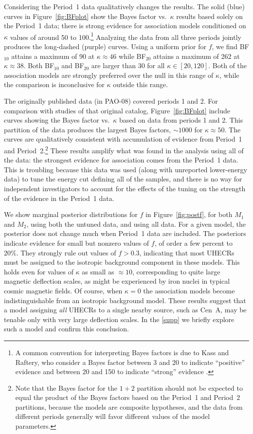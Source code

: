 Considering the Period~1 data qualitatively changes the results.  The
solid (blue) curves in Figure~\ref{fig:BFplot} show the Bayes factor
vs.\ $\kappa$ results based solely on the Period~1 data; there is
strong evidence for association models conditioned on $\kappa$ values
of around 50 to 100.\footnote{A common convention for interpreting
Bayes factors is due to Kass and Raftery, who consider a Bayes factor between
3 and 20 to indicate ``positive'' evidence and between 20 and 150 to indicate
``strong'' evidence \cite{Kass:Raft:baye:1995}.}
Analyzing the data from all three periods jointly produces the long-dashed
(purple) curves.  Using a uniform prior for $f$, we find BF$_{10}$ attains a
maximum of 90 at $\kappa\approx 46$ while BF$_{20}$ attains a maximum of 262
at $\kappa\approx 38$.  Both BF$_{10}$ and BF$_{20}$ are larger than 30 for
all $\kappa\in[20,120]$.  Both of the association models are strongly
preferred over the null in this range of $\kappa$, while the comparison is
inconclusive for $\kappa$ outside this range.

The originally published data (in PAO-08) covered periods 1 and 2.  For
comparison with studies of that original catalog, Figure~\ref{fig:BFplot}
include curves showing the Bayes factor vs.\ $\kappa$ based on data
from periods 1 and 2.  This partition of the data produces the largest
Bayes factors, $\sim 1000$ for $\kappa \approx 50$.  The curves are
qualitatively consistent with accumulation of evidence from Period~1 and
Period~2.\footnote{Note that the Bayes
factor for the $1+2$ partition should not be expected to equal the
product of the Bayes factors based on the Period~1 and Period~2 partitions,
because the models are composite hypotheses, and the data from different
periods generally will favor different values of the model parameters.}
These results amplify what was found in the analysis using all of
the data:  the strongest evidence for association comes from the Period~1
data.  This is troubling because this data was used (along with unreported
lower-energy data) to tune the energy cut defining all of the samples, and
there is no way for independent investigators to account for the effects of
the tuning on the strength of the evidence in the Period~1 data.

We show marginal posterior distributions for $f$ in
Figure~\ref{fig:postf}, for both $M_1$ and $M_2$, using both the untuned
data, and using all data. For a given model, the posterior does not
change much when Period~1 data are included.  The posteriors indicate
evidence for small but nonzero values of $f$, of order a few percent to
20\%.  They strongly rule out values of $f>0.3$, indicating that most
UHECRs must be assigned to the isotropic background component in these
models.
This holds even for values of $\kappa$ as small as $\approx 10$,
corresponding to quite large magnetic deflection scales, as might be
experienced by iron nuclei in typical cosmic magnetic fields.  Of
course, when $\kappa=0$ the association models become indistinguishable
from an isotropic background model.  These results suggest that a model
assigning {\em all} UHECRs to a single nearby source, such as Cen~A, may be
tenable only with very large deflection scales.  In the
\ref{supp} we briefly explore such a model and confirm this
conclusion.

